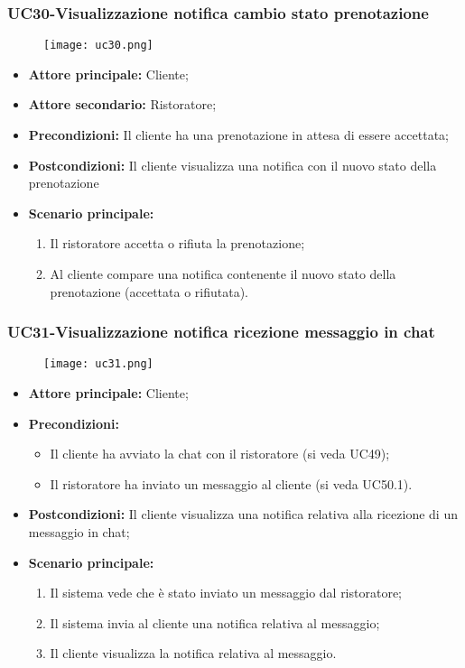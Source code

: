 \pagebreak
\subsubsection{UC30-Visualizzazione notifica cambio stato prenotazione}
\begin{figure}[h] \texttt{[image: uc30.png]} \end{figure}
\begin{itemize}
\item \textbf{Attore principale:} Cliente;
\item \textbf{Attore secondario:} Ristoratore;
\item \textbf{Precondizioni:} Il cliente ha una prenotazione in attesa di essere accettata;
\item \textbf{Postcondizioni:} Il cliente visualizza una notifica con il nuovo stato della prenotazione
\item \textbf{Scenario principale:}
\begin{enumerate}
    \item Il ristoratore accetta o rifiuta la prenotazione;
    \item Al cliente compare una notifica contenente il nuovo stato della prenotazione (accettata o rifiutata).
\end{enumerate}
\end{itemize}

\subsubsection{UC31-Visualizzazione notifica ricezione messaggio in chat}
\begin{figure}[h] \texttt{[image: uc31.png]} \end{figure}
\begin{itemize}
\item \textbf{Attore principale:} Cliente;
\item \textbf{Precondizioni:}
\begin{itemize}
    \item Il cliente ha avviato la chat con il ristoratore (si veda UC49);
    \item Il ristoratore ha inviato un messaggio al cliente (si veda UC50.1).
\end{itemize}
\item \textbf{Postcondizioni:} Il cliente visualizza una notifica relativa alla ricezione di un messaggio in chat;
\item \textbf{Scenario principale:}
\begin{enumerate}
    \item Il sistema vede che è stato inviato un messaggio dal ristoratore;
    \item Il sistema invia al cliente una notifica relativa al messaggio;
    \item Il cliente visualizza la notifica relativa al messaggio.
\end{enumerate}
\end{itemize}

